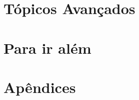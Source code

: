\documentclass[12pt,a4paper,oneside]{extreport}
\begin{document}

\part{Tópicos Avançados}






\part{Para ir além}






\appendix

\part{Apêndices}




\end{document}
